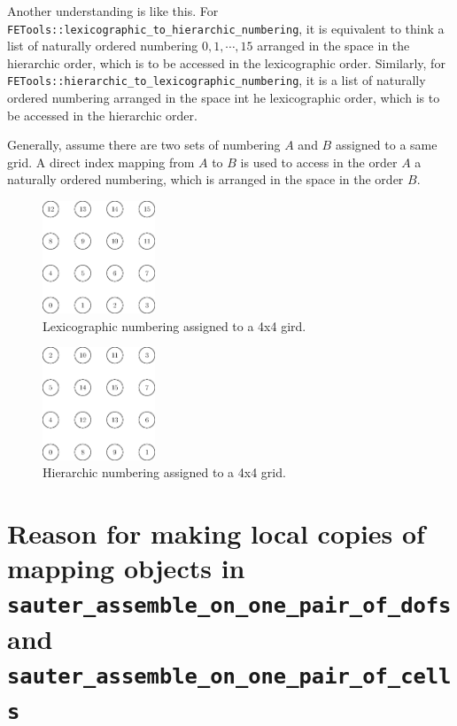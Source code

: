\documentclass[11pt, a4paper]{book}
\begin{document}
Another understanding is like this. For \texttt{FETools::lexicographic\_to\_hierarchic\_numbering}, it is equivalent to think a list of naturally ordered numbering \(0,1,\cdots,15\) arranged in the space in the hierarchic order, which is to be accessed in the lexicographic order. Similarly, for \texttt{FETools::hierarchic\_to\_lexicographic\_numbering}, it is a list of naturally ordered numbering arranged in the space int he lexicographic order, which is to be accessed in the hierarchic order.

Generally, assume there are two sets of numbering \(A\) and \(B\) assigned to a same grid. A direct index mapping from \(A\) to \(B\) is used to access in the order \(A\) a naturally ordered numbering, which is arranged in the space in the order \(B\).

\begin{figure}[htbp]
\centering
\includegraphics[width=0.3\textwidth]{figures/2022-05-25-lexicographic-numbering.eps}
\caption{Lexicographic numbering assigned to a 4x4 gird.}
\end{figure}

\begin{figure}[htbp]
\centering
\includegraphics[width=0.3\textwidth]{figures/2022-05-25-hierarchic-numbering.eps}
\caption{Hierarchic numbering assigned to a 4x4 grid.}
\end{figure}

\section{Reason for making local copies of mapping objects in
  \texttt{sauter\_assemble\_on\_one\_pair\_of\_dofs} and
  \texttt{sauter\_assemble\_on\_one\_pair\_of\_cells}}
\end{document}
